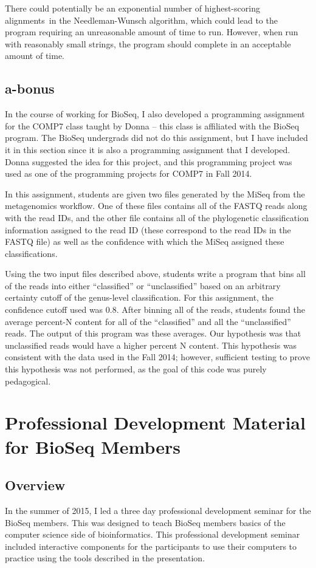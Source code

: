 \documentclass{report}
\begin{document}
There could potentially be an exponential number of highest-scoring alignments~in the Needleman-Wunsch algorithm, which could lead to the program requiring an unreasonable amount of time to run. However, when run with reasonably small strings, the program should complete in an acceptable amount of time.

\subsection{a-bonus}
In the course of working for BioSeq, I also developed a programming assignment for the COMP7 class taught by Donna -- this class is affiliated with the BioSeq program. The BioSeq undergrads did not do this assignment, but I have included it in this section since it is also a programming assignment that I developed. Donna suggested the idea for this project, and this programming project was used as one of the programming projects for COMP7 in Fall 2014.

In this assignment, students are given two files generated by the MiSeq from the metagenomics workflow. One of these files contains all of the FASTQ reads along with the read IDs, and the other file contains all of the phylogenetic classification information assigned to the read ID (these correspond to the read IDs in the FASTQ file) as well as the confidence with which the MiSeq assigned these classifications.

Using the two input files described above, students write a program that bins all of the reads into either ``classified'' or ``unclassified'' based on an arbitrary certainty cutoff of the genus-level classification. For this assignment, the confidence cutoff used was 0.8. After binning all of the reads, students found the average percent-N content for all of the ``classified'' and all the ``unclassified'' reads. The output of this program was these averages. Our hypothesis was that unclassified reads would have a higher percent N content. This hypothesis was consistent with the data used in the Fall 2014; however, sufficient testing to prove this hypothesis was not performed, as the goal of this code was purely pedagogical. 

\section{Professional Development Material for BioSeq Members}
\subsection{Overview}
In the summer of 2015, I led a three day professional development seminar for the BioSeq members. This was designed to teach BioSeq members basics of the computer science side of bioinformatics. This professional development seminar included interactive components for the participants to use their computers to practice using the tools described in the presentation.
\end{document}
